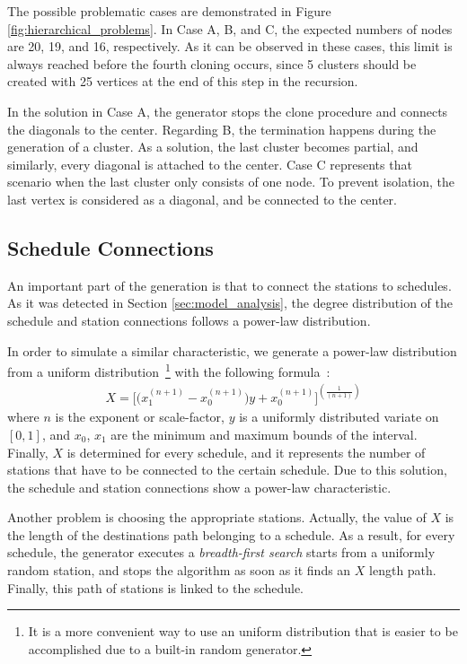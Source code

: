 The possible problematic cases are demonstrated in Figure \ref{fig:hierarchical_problems}. In \textsf{Case A}, \textsf{B}, and \textsf{C}, the expected numbers of nodes are 20, 19, and 16, respectively. As it can be observed in these cases, this limit is always reached before the fourth cloning occurs, since 5 clusters should be created with 25 vertices at the end of this step in the recursion.

In the solution in \textsf{Case A}, the generator stops the clone procedure and connects the diagonals to the center. Regarding \textsf{B}, the termination happens during the generation of a cluster. As a solution, the last cluster becomes partial, and similarly, every diagonal is attached to the center. \textsf{Case C} represents that scenario when the last cluster only consists of one node. To prevent isolation, the last vertex is considered as a diagonal, and be connected to the center.

\subsection{Schedule Connections}\label{sec:schedule_connections}

An important part of the generation is that to connect the stations to schedules. As it was detected in Section \ref{sec:model_analysis}, the degree distribution of the schedule and station connections follows a power-law distribution. %

In order to simulate a similar characteristic, we generate a power-law distribution from a uniform distribution~\footnote{It is a more convenient way to use an uniform distribution that is easier to be accomplished due to a built-in random generator.} with the following formula~\cite{power_law_from_uniform}:
\begin{align}
	X = \Big[\big(x_1^{(n+1)} - x_0^{(n+1)}\big)y + x_0^{(n+1)}\Big]^{(\frac{1}{(n+1)})}
\end{align} 
where $n$ is the exponent or scale-factor, $y$ is a uniformly distributed variate on $[0,1]$, and $x_0$, $x_1$ are the minimum and maximum bounds of the interval. Finally, $X$ is determined for every schedule, and it represents the number of stations that have to be connected to the certain schedule. Due to this solution, the schedule and station connections show a power-law characteristic.

Another problem is choosing the appropriate stations. Actually, the value of $X$ is the length of the destinations path belonging to a schedule. As a result, for every schedule, the generator executes a \textit{breadth-first search} starts from a uniformly random station, and stops the algorithm as soon as it finds an $X$ length path. Finally, this path of stations is linked to the schedule.


